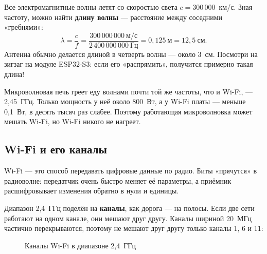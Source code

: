 Все электромагнитные волны летят со скоростью света $c = 300\,000$~км/с. Зная частоту, можно найти
\textbf{длину волны} --- расстояние между соседними «гребнями»:
\[
  \lambda = \frac{c}{f} = \frac{300\,000\,000~\text{м/с}}{2\,400\,000\,000~\text{Гц}} = 0{,}125~\text{м} = 12{,}5~\text{см}.
\]
Антенна обычно делается длиной в четверть волны --- около 3~см. Посмотри на зигзаг на модуле ESP32-S3:
если его «распрямить», получится примерно такая длина!

\begin{fact}
Микроволновая печь греет еду волнами почти той же частоты, что и Wi-Fi, --- 2,45~ГГц. Только
мощность у неё около 800~Вт, а у Wi-Fi платы --- меньше 0,1~Вт, в десять тысяч раз слабее. Поэтому
работающая микроволновка может мешать Wi-Fi, но Wi-Fi никого не нагреет.
\end{fact}

\subsection{Wi-Fi и его каналы}

Wi-Fi --- это способ передавать цифровые данные по радио. Биты «прячутся» в радиоволне: передатчик
очень быстро меняет её параметры, а приёмник расшифровывает изменения обратно в нули и единицы.

Диапазон 2,4~ГГц поделён на \textbf{каналы}, как дорога --- на полосы. Если две сети работают на одном
канале, они мешают друг другу. Каналы шириной 20~МГц частично перекрываются, поэтому не мешают друг
другу только каналы 1, 6 и 11:

\begin{figure}[H]
\centering
{}
\caption{Каналы Wi-Fi в диапазоне 2,4~ГГц}
\end{figure}

